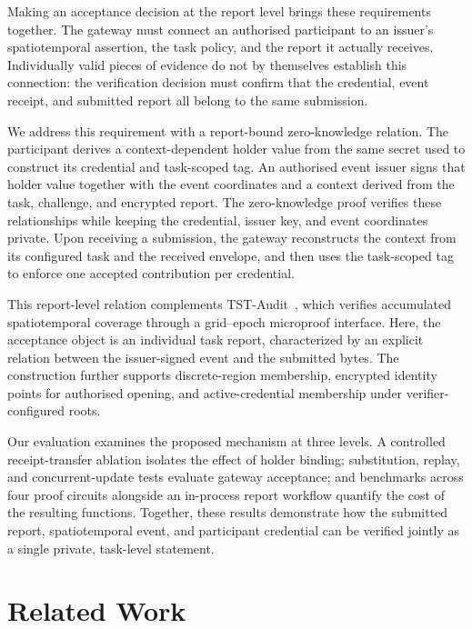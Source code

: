 \documentclass[pdflatex,iicol,sn-mathphys-num]{sn-jnl}
\begin{document}
Making an acceptance decision at the report level brings these requirements together. The gateway must connect an authorised participant to an issuer's spatiotemporal assertion, the task policy, and the report it actually receives. Individually valid pieces of evidence do not by themselves establish this connection: the verification decision must confirm that the credential, event receipt, and submitted report all belong to the same submission.

We address this requirement with a report-bound zero-knowledge relation. The participant derives a context-dependent holder value from the same secret used to construct its credential and task-scoped tag. An authorised event issuer signs that holder value together with the event coordinates and a context derived from the task, challenge, and encrypted report. The zero-knowledge proof verifies these relationships while keeping the credential, issuer key, and event coordinates private. Upon receiving a submission, the gateway reconstructs the context from its configured task and the received envelope, and then uses the task-scoped tag to enforce one accepted contribution per credential.

This report-level relation complements TST-Audit~\citep{He2026TSTAudit}, which verifies accumulated spatiotemporal coverage through a grid--epoch microproof interface. Here, the acceptance object is an individual task report, characterized by an explicit relation between the issuer-signed event and the submitted bytes. The construction further supports discrete-region membership, encrypted identity points for authorised opening, and active-credential membership under verifier-configured roots.

Our evaluation examines the proposed mechanism at three levels. A controlled receipt-transfer ablation isolates the effect of holder binding; substitution, replay, and concurrent-update tests evaluate gateway acceptance; and benchmarks across four proof circuits alongside an in-process report workflow quantify the cost of the resulting functions. Together, these results demonstrate how the submitted report, spatiotemporal event, and participant credential can be verified jointly as a single private, task-level statement.

\section{Related Work}
\end{document}
